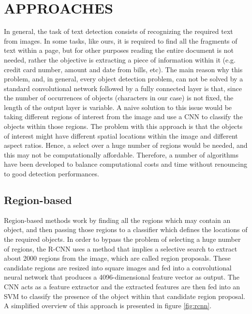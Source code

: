 \section{APPROACHES}
\label{sec:approaches}

In general, the task of text detection consists of recognizing the required text from images. In some tasks, like ours, it is required to find all the fragments of text within a page, but for other purposes reading the entire document is not needed, rather the objective is extracting a piece of information within it (e.g. credit card number, amount and date from bills, etc). The main reason why this problem, and, in general, every object detection problem, can not be solved by a standard convolutional network followed by a fully connected layer is that, since the number of occurrences of objects (characters in our case) is not fixed, the length of the output layer is variable. A naive solution to this issue would be taking different regions of interest from the image and use a CNN to classify the objects within those regions. The problem with this approach is that the objects of interest might have different spatial locations within the image and different aspect ratios. Hence, a select over a huge number of regions would be needed, and this may not be computationally affordable. Therefore, a number of algorithms have been developed to balance computational costs and time without renouncing to good detection performances.

\subsection{Region-based}
\label{ssec:regionbased}

Region-based methods work by finding all the regions which may contain an object, and then passing those regions to a classifier which defines the locations of the required objects. In order to bypass the problem of selecting a huge number of regions, the R-CNN uses a method that implies a selective search to extract about 2000 regions from the image, which are called region proposals. These candidate regions are resized into square images and fed into a convolutional neural network that produces a 4096-dimensional feature vector as output. The CNN acts as a feature extractor and the extracted features are then fed into an SVM to classify the presence of the object within that candidate region proposal. A simplified overview of this approach is presented in figure \ref{fig:rcnn}.

